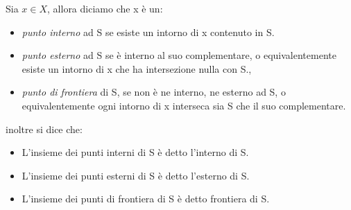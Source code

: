 \documentclass[a4paper]{article}
\begin{document}
\begin{deff} Sia $x \in X $, allora diciamo che x è un: 
\begin{itemize} 
	\item \emph{punto interno} ad S se esiste un intorno di x contenuto in S. 
	\item \emph{punto esterno} ad S se è interno al suo complementare, o equivalentemente esiste un intorno di x che ha intersezione nulla con S.,
	\item \emph{punto di frontiera} di S, se non è ne interno, ne esterno ad S, o equivalentemente ogni intorno di x interseca sia S che il suo complementare.
\end{itemize}
inoltre si dice che:
\begin{itemize}
	\item L'insieme dei punti interni di S è detto l'interno di S.
	\item L'insieme dei punti esterni di S è detto l'esterno di S.
	\item L'insieme dei punti di frontiera di S è detto frontiera di S.
\end{itemize}

\end{deff}	 
\end{document}
